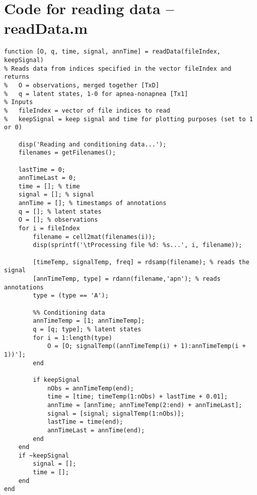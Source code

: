 \chapter{Code for reading data -- readData.m}
\label{ch:readingDataCode}
\begin{lstlisting}
function [O, q, time, signal, annTime] = readData(fileIndex, keepSignal)
% Reads data from indices specified in the vector fileIndex and returns
%   O = observations, merged together [TxD]
%   q = latent states, 1-0 for apnea-nonapnea [Tx1]
% Inputs
%   fileIndex = vector of file indices to read
%   keepSignal = keep signal and time for plotting purposes (set to 1 or 0)
    
    disp('Reading and conditioning data...');
    filenames = getFilenames();
    
    lastTime = 0;
    annTimeLast = 0;
    time = []; % time
    signal = []; % signal
    annTime = []; % timestamps of annotations
    q = []; % latent states
    O = []; % observations
    for i = fileIndex
        filename = cell2mat(filenames(i));
        disp(sprintf('\tProcessing file %d: %s...', i, filename));
        
        [timeTemp, signalTemp, freq] = rdsamp(filename); % reads the signal
        [annTimeTemp, type] = rdann(filename,'apn'); % reads annotations
        type = (type == 'A');

        %% Conditioning data
        annTimeTemp = [1; annTimeTemp];
        q = [q; type]; % latent states
        for i = 1:length(type)
            O = [O; signalTemp((annTimeTemp(i) + 1):annTimeTemp(i + 1))'];
        end
        
        if keepSignal
            nObs = annTimeTemp(end);
            time = [time; timeTemp(1:nObs) + lastTime + 0.01];
            annTime = [annTime; annTimeTemp(2:end) + annTimeLast];
            signal = [signal; signalTemp(1:nObs)];
            lastTime = time(end);
            annTimeLast = annTime(end);
        end
    end
    if ~keepSignal
        signal = [];
        time = [];
    end
end
\end{lstlisting}